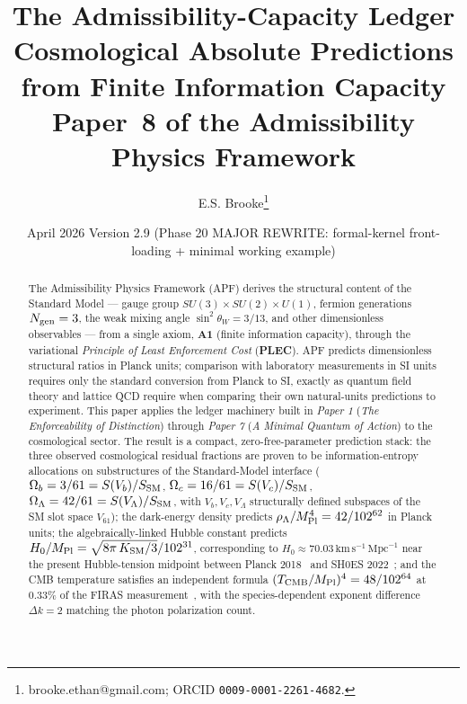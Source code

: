 \documentclass[11pt]{article}
\title{\textbf{The Admissibility-Capacity Ledger}\\[0.4em]
\large Cosmological Absolute Predictions from Finite Information Capacity\\[0.6em]
\normalsize Paper~8 of the Admissibility Physics Framework}
\author{E.S. Brooke\thanks{brooke.ethan@gmail.com; ORCID \texttt{0009-0001-2261-4682}.}}
\date{April 2026 \quad\textbar\quad Version 2.9 (Phase 20 MAJOR REWRITE: formal-kernel front-loading + minimal working example)}
\newcommand{\paperref}[2]{\emph{Paper #1} (\emph{#2})}
\newcommand{\Aone}{\textbf{A1}}
\newcommand{\PLEC}{\textbf{PLEC}}
\newcommand{\Mpl}{M_{\rm Pl}}
\begin{document}

\maketitle

\begin{abstract}
\noindent
The Admissibility Physics Framework (APF) derives the structural content of the Standard Model --- gauge group $SU(3)\times SU(2)\times U(1)$, fermion generations $N_{\rm gen}=3$, the weak mixing angle $\sin^2\theta_W = 3/13$, and other dimensionless observables --- from a single axiom, \Aone{} (finite information capacity), through the variational \emph{Principle of Least Enforcement Cost} (\PLEC). APF predicts dimensionless structural ratios in Planck units; comparison with laboratory measurements in SI units requires only the standard conversion from Planck to SI, exactly as quantum field theory and lattice QCD require when comparing their own natural-units predictions to experiment.
This paper applies the ledger machinery built in \paperref{1}{The Enforceability of Distinction} through \paperref{7}{A Minimal Quantum of Action} to the cosmological sector. The result is a compact, zero-free-parameter prediction stack:
the three observed cosmological residual fractions are proven to be information-entropy allocations on substructures of the Standard-Model interface ($\Omega_b = 3/61 = S(V_b)/S_{\rm SM}$, $\Omega_c = 16/61 = S(V_c)/S_{\rm SM}$, $\Omega_\Lambda = 42/61 = S(V_\Lambda)/S_{\rm SM}$, with $V_b, V_c, V_\Lambda$ structurally defined subspaces of the SM slot space $V_{61}$);
the dark-energy density predicts $\rho_\Lambda/\Mpl^4 = 42/102^{62}$ in Planck units; the algebraically-linked Hubble constant predicts $H_0/\Mpl = \sqrt{8\pi\,K_{\rm SM}/3}/102^{31}$, corresponding to $H_0 \approx 70.03\,\mathrm{km}\,\mathrm{s}^{-1}\,\mathrm{Mpc}^{-1}$ near the present Hubble-tension midpoint between Planck 2018~\cite{Planck2018} and SH0ES 2022~\cite{Riess2022}; and the CMB temperature satisfies an independent formula $(T_{\rm CMB}/\Mpl)^4 = 48/102^{64}$ at $0.33\%$ of the FIRAS measurement~\cite{Fixsen2009}, with the species-dependent exponent difference $\Delta k = 2$ matching the photon polarization count.

\end{abstract}
\end{document}
